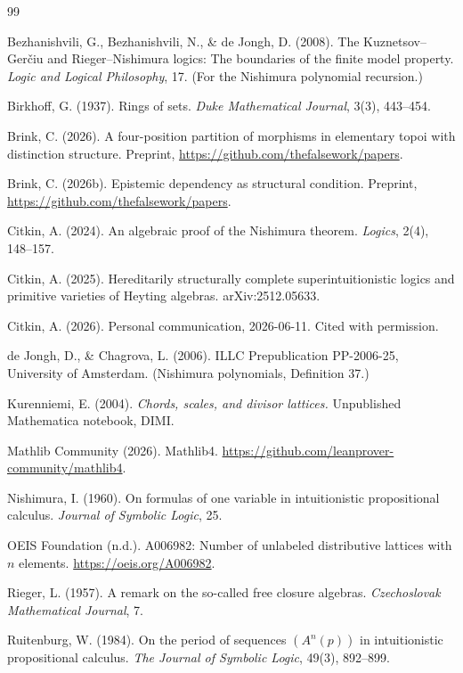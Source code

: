 ﻿\documentclass[11pt]{amsart}
\theoremstyle{plain}
\theoremstyle{definition}
\theoremstyle{remark}
\begin{document}
\begin{thebibliography}{99}

Bezhanishvili, G., Bezhanishvili, N., \& de Jongh, D. (2008).
The Kuznetsov--Ger\v{c}iu and Rieger--Nishimura logics: The boundaries of the
finite model property.
\emph{Logic and Logical Philosophy}, 17.
(For the Nishimura polynomial recursion.)

Birkhoff, G. (1937).
Rings of sets.
\emph{Duke Mathematical Journal}, 3(3), 443--454.

Brink, C. (2026).
A four-position partition of morphisms in elementary topoi with distinction
structure.
Preprint, \url{https://github.com/thefalsework/papers}.

Brink, C. (2026b).
Epistemic dependency as structural condition.
Preprint, \url{https://github.com/thefalsework/papers}.

Citkin, A. (2024).
An algebraic proof of the Nishimura theorem.
\emph{Logics}, 2(4), 148--157.

Citkin, A. (2025).
Hereditarily structurally complete superintuitionistic logics and primitive
varieties of Heyting algebras.
arXiv:2512.05633.

Citkin, A. (2026).
Personal communication, 2026-06-11. Cited with permission.

de Jongh, D., \& Chagrova, L. (2006).
ILLC Prepublication PP-2006-25, University of Amsterdam.
(Nishimura polynomials, Definition 37.)

Kurenniemi, E. (2004).
\emph{Chords, scales, and divisor lattices.}
Unpublished Mathematica notebook, DIMI.

Mathlib Community (2026).
Mathlib4.
\url{https://github.com/leanprover-community/mathlib4}.

Nishimura, I. (1960).
On formulas of one variable in intuitionistic propositional calculus.
\emph{Journal of Symbolic Logic}, 25.

OEIS Foundation (n.d.).
A006982: Number of unlabeled distributive lattices with $n$ elements.
\url{https://oeis.org/A006982}.

Rieger, L. (1957).
A remark on the so-called free closure algebras.
\emph{Czechoslovak Mathematical Journal}, 7.

Ruitenburg, W. (1984).
On the period of sequences $(A^n(p))$ in intuitionistic propositional
calculus.
\emph{The Journal of Symbolic Logic}, 49(3), 892--899.

\end{thebibliography}
\end{document}
